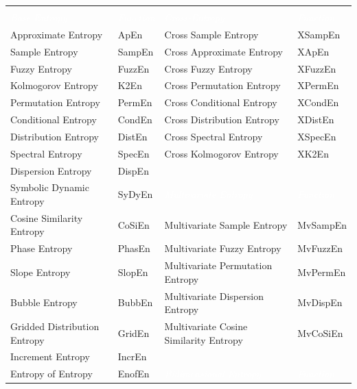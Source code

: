 \documentclass[12pt, a4paper, titlepage, openany]{book}
\begin{document}
\newpage
\vspace{2cm} 
\begin{center}
\begin{table}[!ht]
\begin{tabular}{|p{50mm}|p{20mm}|p{63mm}|p{25mm}|}
 \hline
\rowcolor{ehone} \multicolumn{4}{|c|}{\textbf{\textcolor{white}{EntropyHub Function List}}} \\
\rowcolor{ehone} \emph{\textcolor{white}{Base Entropy}} & \emph{\textcolor{white}{Function}} &  
\emph{\textcolor{white}{Cross-Entropy}} &  \emph{\textcolor{white}{Function}} \\
Approximate Entropy		&	ApEn			&	Cross Sample Entropy	    &	XSampEn \\
Sample Entropy			&	SampEn			&	Cross Approximate Entropy	&	XApEn   \\
Fuzzy Entropy			&	FuzzEn			&	Cross Fuzzy Entropy			&	XFuzzEn	\\
Kolmogorov Entropy		&	K2En			&	Cross Permutation Entropy	&	XPermEn \\
Permutation Entropy		&	PermEn			&	Cross Conditional Entropy	&	XCondEn	\\
Conditional Entropy		&	CondEn			&	Cross Distribution Entropy	&	XDistEn	\\
Distribution Entropy	&	DistEn			&	Cross Spectral Entropy		&	XSpecEn	\\
Spectral Entropy		&	SpecEn			&	Cross Kolmogorov Entropy	&	XK2En	\\
Dispersion Entropy		&	DispEn	 	 	&		\						&	\\
Symbolic Dynamic Entropy &	SyDyEn			&		\cellcolor{ehone} \emph{\textcolor{white}{Multivariate Entropy}}	&	\cellcolor{ehone} \emph{\textcolor{white}{Function}} \\
Cosine Similarity Entropy &	CoSiEn			&	Multivariate Sample Entropy		   &	MvSampEn \\
Phase Entropy			&	PhasEn			&	Multivariate Fuzzy Entropy		   &	MvFuzzEn \\
Slope Entropy			&	SlopEn			&	Multivariate Permutation Entropy   &	MvPermEn \\
Bubble Entropy			&	BubbEn		 	&	Multivariate Dispersion Entropy    &	MvDispEn \\
Gridded Distribution Entropy &	GridEn	  	&	Multivariate Cosine Similarity Entropy    &	MvCoSiEn \\	 
Increment Entropy		&	IncrEn			&	\  &   \\ 
Entropy of Entropy		& 	EnofEn	  		&	\cellcolor{ehone} \emph{\textcolor{white}{Bidimensional Entropy}}		&	\cellcolor{ehone} \emph{\textcolor{white}{Function}}  \\

\end{tabular}
\end{table}
\end{center}
\end{document}
